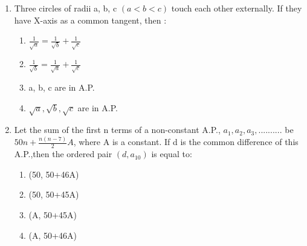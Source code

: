 \begin{enumerate}[label=\arabic*.,ref=\thesubsection.\theenumi]
\item Three circles of radii a, b, c $(a < b < c)$ touch each other externally. If they have X-axis as a common tangent, then :
\begin{enumerate}
\item $\frac{1}{\sqrt{a}}=\frac{1}{\sqrt{b}}+\frac{1}{\sqrt{c}}$
\item $\frac{1}{\sqrt{b}}=\frac{1}{\sqrt{a}}+\frac{1}{\sqrt{c}}$
\item a, b, c are in A.P.
\item $\sqrt{a}, \sqrt{b} ,\sqrt{c}$ are in A.P.
\end{enumerate}
\item Let the sum of the first n terms of a non-constant A.P., $a_1,a_2,a_3,..........$ be 
$50n+\frac{n(n-7)}{2}A$, where A is a constant. If d is the common difference of this A.P.,then the ordered pair $(d,a_{10})$ is equal to:
\begin{enumerate}
\item (50, 50+46A)
\item (50, 50+45A)
\item (A, 50+45A)
\item (A, 50+46A)
\end{enumerate}
\end{enumerate} 
 
